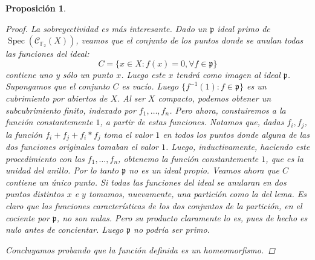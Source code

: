 \documentclass[11pt,a4paper, spanish,oneside,fleqn]{article}
\newtheorem{prop}[teo]{Proposición}
\theoremstyle{definition}
\newcommand{\FF}{\mathbb{F}}
\DeclareMathOperator{\spec}{Spec}
\begin{document}
\begin{prop}
\begin{proof}
La sobreyectividad es m\'as interesante. Dado un $\mathfrak{p}$ ideal
primo de $\spec(\mathscr{C}_{\FF_2}(X))$, veamos que el conjunto de los
puntos donde se anulan todas las funciones del ideal:
$$ C = \{x\in X : f(x) = 0, \forall f \in \mathfrak{p}\}$$
contiene uno y s\'olo un punto $x$. Luego este $x$ tendr\'a como imagen al ideal $\mathfrak{p}$.
Supongamos que el conjunto $C$ es vac\'io. Luego $\{f^{-1}(1) : f \in \mathfrak{p}\}$ es un
cubrimiento por abiertos de $X$. Al ser $X$ compacto, podemos obtener un subcubrimiento finito,
indexado por $f_1,\ldots,f_n$. Pero ahora, constuiremos a la funci\'on constantemente
$1$, a partir de estas funciones. Notamos que, dadas $f_i,f_j$, la funci\'on $f_i + f_j + f_i * f_j$ toma
el valor $1$ en todos los puntos donde alguna de las dos funciones originales tomaban el valor $1$.
Luego, inductivamente, haciendo este procedimiento con las $f_1,\ldots,f_n$, obtenemo
la funci\'on constantemente $1$, que es la unidad del anillo. Por lo tanto $\mathfrak{p}$ no es
un ideal propio.
Veamos ahora que $C$ contiene un \'unico punto. Si todas las funciones del ideal se anularan en dos
puntos distintos $x$ e $y$ tomamos, nuevamente, una partici\'on como la del lema.
Es claro que las funciones caracter\'isticas de los dos conjuntos de la partici\'on,
en el cociente por $\mathfrak{p}$, no son nulas. Pero su producto
claramente lo es, pues de hecho es nulo antes de concientar. Luego $\mathfrak{p}$ no podr\'ia ser
primo.

Concluyamos probando que la funci\'on definida es un homeomorfismo.


\end{proof}
\end{prop}
\end{document}
